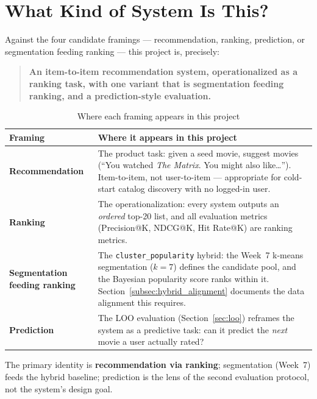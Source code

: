 \documentclass[12pt,a4paper]{article}
\begin{document}
\section{What Kind of System Is This?}
\label{sec:framing}

Against the four candidate framings --- recommendation, ranking, prediction, or segmentation
feeding ranking --- this project is, precisely:

\begin{quote}
  \textbf{An item-to-item recommendation system, operationalized as a ranking task, with one
  variant that is segmentation feeding ranking, and a prediction-style evaluation.}
\end{quote}

\begin{table}[H]
\centering
\caption{Where each framing appears in this project}
\label{tab:framing}
\begin{tabular}{p{3.6cm}p{10.4cm}}
\toprule
\textbf{Framing} & \textbf{Where it appears in this project} \\
\midrule
\textbf{Recommendation} & The product task: given a seed movie, suggest movies (``You watched \emph{The Matrix}. You might also like\ldots''). Item-to-item, not user-to-item --- appropriate for cold-start catalog discovery with no logged-in user. \\
\textbf{Ranking} & The operationalization: every system outputs an \emph{ordered} top-20 list, and all evaluation metrics (Precision@K, NDCG@K, Hit Rate@K) are ranking metrics. \\
\textbf{Segmentation feeding ranking} & The \texttt{cluster\_popularity} hybrid: the Week~7 k-means segmentation ($k=7$) defines the candidate pool, and the Bayesian popularity score ranks within it. Section~\ref{subsec:hybrid_alignment} documents the data alignment this requires. \\
\textbf{Prediction} & The LOO evaluation (Section~\ref{sec:loo}) reframes the system as a predictive task: can it predict the \emph{next} movie a user actually rated? \\
\bottomrule
\end{tabular}
\end{table}

The primary identity is \textbf{recommendation via ranking}; segmentation (Week~7) feeds the
hybrid baseline; prediction is the lens of the second evaluation protocol, not the system's
design goal.
\end{document}
